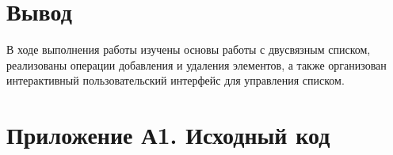 \documentclass[oneside,a4paper,14pt]{extarticle}
\begin{document}
\section*{Вывод}

В ходе выполнения работы изучены основы работы с двусвязным списком, реализованы операции добавления и удаления элементов, а также организован интерактивный пользовательский интерфейс для управления списком.

\newpage
\section*{Приложение А1. Исходный код}

\inputminted[fontsize = \small]{C}{code/heap_sort.c}
\end{document}
